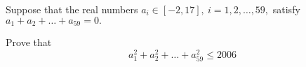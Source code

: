 Suppose that the real numbers $a_i\in [-2,17],\ i=1,2,\ldots,59,$ satisfy $a_1+a_2+\ldots+a_{59}=0.$

Prove that\[a_1^2+a_2^2+\ldots+a_{59}^2\le 2006\]